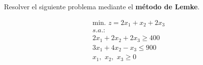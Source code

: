 Resolver el siguiente problema mediante el \textbf{método de Lemke}.

\begin{equation}
\begin{split}
\mbox{min. } z = 2x_1 + x_2 + 2x_3\\
s.a.:\\
2x_1 + 2x_2 + 2x_3 \geq 400\\
3x_1 + 4x_2 - x_3 \leq 900\\
x_1,\,\,x_2,\,\,x_3\geq 0\\
\end{split}
\end{equation}